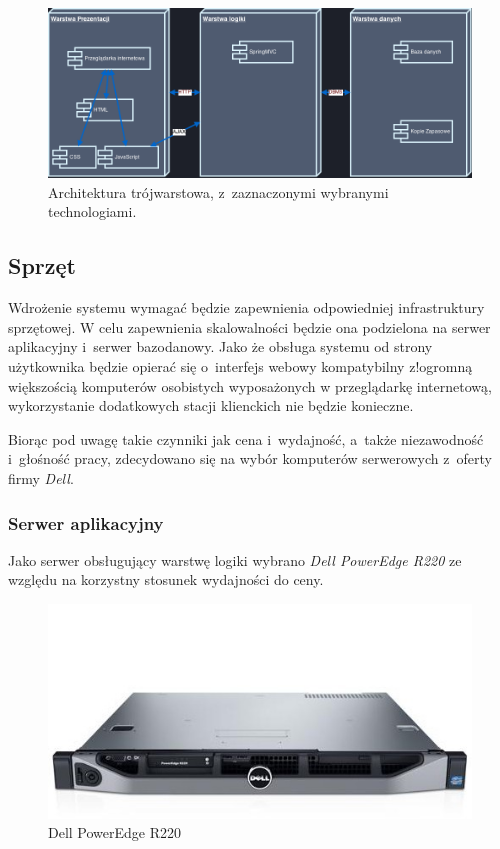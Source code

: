 \begin{figure}[H]
  \includegraphics[width=\textwidth]{images/3tier.png}
  \caption{Architektura trójwarstowa, z~zaznaczonymi wybranymi technologiami.}
\end{figure}

\subsection{Sprzęt}

Wdrożenie systemu wymagać będzie zapewnienia odpowiedniej infrastruktury sprzętowej. W celu zapewnienia skalowalności będzie ona podzielona na serwer aplikacyjny i~serwer bazodanowy. Jako że obsługa systemu od strony użytkownika będzie opierać się o~interfejs webowy kompatybilny z!ogromną większością komputerów osobistych wyposażonych w przeglądarkę internetową, wykorzystanie dodatkowych stacji klienckich nie będzie konieczne.

Biorąc pod uwagę takie czynniki jak cena i~wydajność, a~także niezawodność i~głośność pracy, zdecydowano się na wybór komputerów serwerowych z~oferty firmy \textit{Dell}.

\subsubsection{Serwer aplikacyjny}

Jako serwer obsługujący warstwę logiki wybrano \textit{Dell PowerEdge R220} ze względu na korzystny stosunek wydajności do ceny.

\begin{figure}[H]
  \includegraphics[width=\textwidth]{images/poweredge-r220.jpg}
  \caption{Dell PowerEdge R220}
\end{figure}

